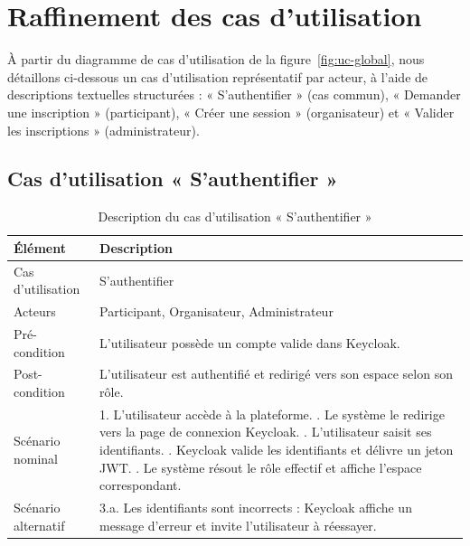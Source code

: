 \documentclass[12pt,a4paper,oneside]{report}
\begin{document}
\section{Raffinement des cas d'utilisation}
À partir du diagramme de cas d'utilisation de la figure~\ref{fig:uc-global}, nous détaillons
ci-dessous un cas d'utilisation représentatif par acteur, à l'aide de descriptions textuelles
structurées : « S'authentifier » (cas commun), « Demander une inscription » (participant),
« Créer une session » (organisateur) et « Valider les inscriptions » (administrateur).

\subsection{Cas d'utilisation « S'authentifier »}
\begin{table}[H]\centering\renewcommand{\arraystretch}{1.25}
\begin{tabular}{|p{3.4cm}|p{10.3cm}|}\hline
\rowcolor{gray!15}\textbf{Élément} & \textbf{Description} \\ \hline
Cas d'utilisation & S'authentifier \\ \hline
Acteurs & Participant, Organisateur, Administrateur \\ \hline
Pré-condition & L'utilisateur possède un compte valide dans Keycloak. \\ \hline
Post-condition & L'utilisateur est authentifié et redirigé vers son espace selon son rôle. \\ \hline
Scénario nominal &
1. L'utilisateur accède à la plateforme. \newline
2. Le système le redirige vers la page de connexion Keycloak. \newline
3. L'utilisateur saisit ses identifiants. \newline
4. Keycloak valide les identifiants et délivre un jeton JWT. \newline
5. Le système résout le rôle effectif et affiche l'espace correspondant. \\ \hline
Scénario alternatif &
3.a. Les identifiants sont incorrects : Keycloak affiche un message d'erreur et invite
l'utilisateur à réessayer. \\ \hline
\end{tabular}
\caption{Description du cas d'utilisation « S'authentifier »}\label{tab:uc-auth}
\end{table}
\end{document}
